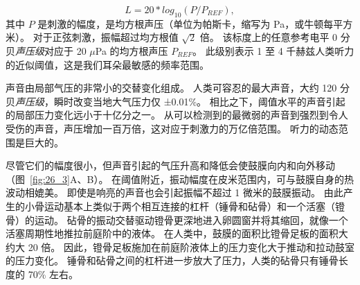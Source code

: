 \begin{equation}\label{sound_pressure}
	L = 20 * log_10 (P/P_{REF}),
\end{equation}
%
其中 $P$ 是刺激的幅度，是均方根声压（单位为帕斯卡，缩写为 Pa，或牛顿每平方米）。 
对于正弦刺激，振幅超过均方根值 $ \sqrt{2}$ 倍。 
该标度上的任意参考电平 0 分贝\textit{声压级}对应于 20 $\mu$Pa 的均方根声压 $P_{REF}$。
此级别表示 1 至 4 千赫兹人类听力的近似阈值，这是我们耳朵最敏感的频率范围。


声音由局部气压的非常小的交替变化组成。
人类可容忍的最大声音，大约 120 分贝\textit{声压级}，瞬时改变当地大气压力仅 ±0.01\%。
相比之下，阈值水平的声音引起的局部压力变化远小于十亿分之一。
从可以检测到的最微弱的声音到强烈到令人受伤的声音，声压增加一百万倍，这对应于刺激力的万亿倍范围。
听力的动态范围是巨大的。


尽管它们的幅度很小，但声音引起的气压升高和降低会使鼓膜向内和向外移动（图~\ref{fig:26_3}A、B）。
在阈值附近，振动幅度在皮米范围内，可与鼓膜自身的热波动相媲美。
即使是响亮的声音也会引起振幅不超过 1 微米的鼓膜振动。
由此产生的小骨运动基本上类似于两个相互连接的杠杆（锤骨和砧骨）和一个活塞（镫骨）的运动。
砧骨的振动交替驱动镫骨更深地进入卵圆窗并将其缩回，就像一个活塞周期性地推拉前庭阶中的液体。
在人类中，鼓膜的面积比镫骨足板的面积大约大 20 倍。
因此，镫骨足板施加在前庭阶液体上的压力变化大于推动和拉动鼓室的压力变化。
锤骨和砧骨之间的杠杆进一步放大了压力，人类的砧骨只有锤骨长度的 70\% 左右。



